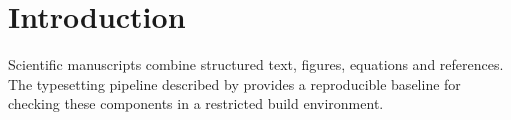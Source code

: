 \section{Introduction}\label{sec:introduction}
Scientific manuscripts combine structured text, figures, equations and references.
The typesetting pipeline described by \cite{lamport1994} provides a reproducible
baseline for checking these components in a restricted build environment.
